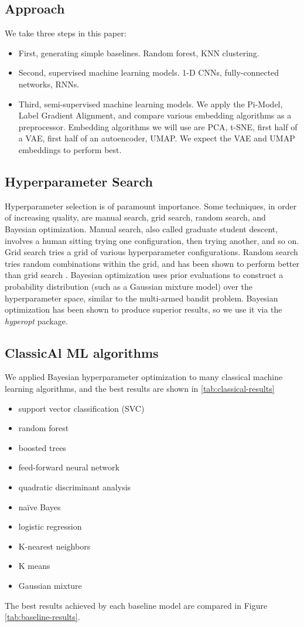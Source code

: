 \documentclass{article}
\begin{document}
\subsection{Approach}
We take three steps in this paper:
\begin{itemize}
    \item First, generating simple baselines. Random forest, KNN clustering.
	\item Second, supervised machine learning models. 1-D CNNs, fully-connected networks, RNNs.
    \item Third, semi-supervised machine learning models. We apply the Pi-Model, Label Gradient Alignment, and compare various embedding algorithms as a preprocessor. Embedding algorithms we will use are PCA, t-SNE, first half of a VAE, first half of an autoencoder, UMAP. We expect the VAE and UMAP embeddings to perform best.
\end{itemize}

\subsection{Hyperparameter Search}
Hyperparameter selection is of paramount importance. Some techniques, in order of increasing quality, are manual search, grid search, random search, and Bayesian optimization. Manual search, also called graduate student descent, involves a human sitting trying one configuration, then trying another, and so on. Grid search tries a grid of various hyperparameter configurations. Random search tries random combinations within the grid, and has been shown to perform better than grid search \cite{}. Bayesian optimization uses prior evaluations to construct a probability distribution (such as a Gaussian mixture model) over the hyperparameter space, similar to the multi-armed bandit problem. Bayesian optimization has been shown to produce superior results, so we use it via the \textit{hyperopt} package. 

\subsection{ClassicAl ML algorithms}
We applied Bayesian hyperparameter optimization to many classical machine learning algorithms, and the best results are shown in \ref{tab:classical-results}

\begin{itemize}
    \item support vector classification (SVC)
    \item random forest
    \item boosted trees
    \item feed-forward neural network
    \item quadratic discriminant analysis
    \item na\"ive Bayes
    \item logistic regression
    \item K-nearest neighbors
    \item K means
    \item Gaussian mixture
\end{itemize}
The best results achieved by each baseline model are compared in Figure \ref{tab:baseline-results}.
\end{document}
